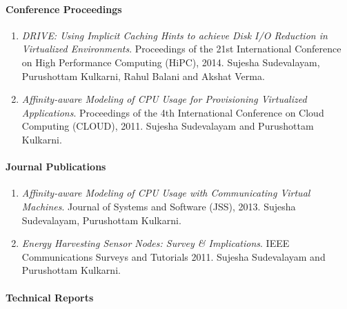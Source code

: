 \paragraph{Conference Proceedings}

\begin{enumerate}
    \item \textit{DRIVE: Using Implicit Caching Hints to achieve Disk I/O Reduction in Virtualized Environments}. Proceedings of the 21st International Conference on High Performance Computing (HiPC), 2014. Sujesha Sudevalayam, Purushottam Kulkarni, Rahul Balani and Akshat Verma. 
    \item \textit{Affinity-aware Modeling of CPU Usage for Provisioning Virtualized Applications}. Proceedings of the 4th International Conference on Cloud Computing (CLOUD), 2011. Sujesha Sudevalayam and Purushottam Kulkarni.
\end{enumerate}

\paragraph{Journal Publications}

\begin{enumerate}
    \item \textit{Affinity-aware Modeling of CPU Usage with Communicating Virtual Machines}. Journal of Systems and Software (JSS), 2013. Sujesha Sudevalayam, Purushottam Kulkarni.
    \item \textit{Energy Harvesting Sensor Nodes: Survey \& Implications}. IEEE Communications Surveys and Tutorials 2011. Sujesha Sudevalayam and Purushottam Kulkarni.
\end{enumerate}

\paragraph{Technical Reports}

